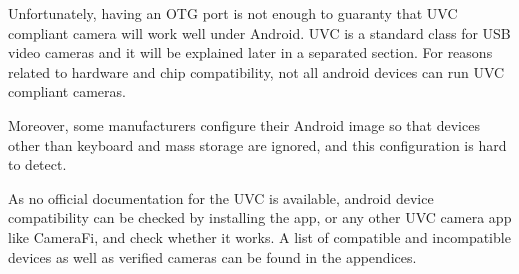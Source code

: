 Unfortunately, having an OTG port is not enough to guaranty that UVC compliant camera will work well under Android. UVC is a standard class for USB video cameras and it will be explained later in a separated section. For reasons related to hardware and chip compatibility, not all android devices can run UVC compliant cameras. 

Moreover, some manufacturers configure their Android image so that devices other than keyboard and mass storage are ignored, and this configuration is hard to detect. 

As no official documentation for the UVC is available, android device compatibility can be checked by installing the app, or any other UVC camera app like CameraFi, and check whether it works. 
A list of compatible and incompatible devices as well as verified cameras can be found in the appendices.


